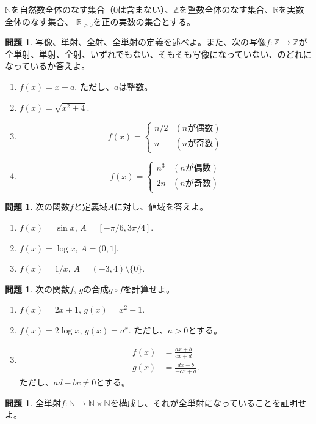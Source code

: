 \documentclass[uplatex]{jsarticle}
\theoremstyle{definition}
\numberwithin{equation}{section}
\newtheorem{prob}[section]{問題}
\newcommand{\R}{\mathbb{R}}
\newcommand{\Z}{\mathbb{Z}}
\newcommand{\N}{\mathbb{N}}
\begin{document}
$\N$を自然数全体のなす集合（0は含まない）、$\Z$を整数全体のなす集合、$\R$を実数全体のなす集合、
$\R_{>0}$を正の実数の集合とする。
\begin{prob}
  写像、単射、全射、全単射の定義を述べよ。また、次の写像$f:\Z\to\Z$が全単射、単射、全射、いずれでもない、そもそも写像になっていない、のどれになっているか答えよ。
  \begin{enumerate}
    \item $f(x)=x+a$. ただし、$a$は整数。
    \item $f(x)=\sqrt{x^2+4}$.
    \item
      \[
        f(x)=\begin{cases}
          n/2 & (n\text{が偶数}) \\
          n & (n\text{が奇数})
        \end{cases}
      \]
    \item
      \[
        f(x)=\begin{cases}
          n^3 & (n\text{が偶数}) \\
          2n & (n\text{が奇数})
        \end{cases}
      \]
  \end{enumerate}
\end{prob}

\begin{prob}
  次の関数$f$と定義域$A$に対し、値域を答えよ。
  \begin{enumerate}
    \item $f(x)=\sin x$, $A=[-\pi/6, 3\pi/4]$.
    \item $f(x)=\log x$, $A=(0, 1]$.
    \item $f(x)=1/x$, $A=(-3,4)\setminus{\{0\}}$.
  \end{enumerate}
\end{prob}

\begin{prob}
  次の関数$f$, $g$の合成$g\circ f$を計算せよ。
  \begin{enumerate}
    \item $f(x)=2x+1$, $g(x)=x^2-1$.
    \item $f(x)=2\log x$, $g(x)=a^x$. ただし、$a>0$とする。
    \item
      \begin{align*}
        f(x)&=\frac{ax+b}{cx+d}\\
        g(x)&=\frac{dx-b}{-cx+a}.
      \end{align*}
      ただし、$ad-bc \not= 0$とする。
  \end{enumerate}

\end{prob}

\begin{prob}
  全単射$f:\N\to\N\times\N$を構成し、それが全単射になっていることを証明せよ。
\end{prob}
\end{document}
